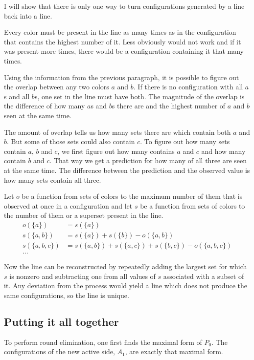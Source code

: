 \documentclass[english, 12pt, a4paper, sci, a-1b, online]{aaltothesis}
\begin{document}
I will show that there is only one way to turn configurations generated by a line back into a line.

Every color must be present in the line as many times as in the configuration that contains the highest number of it. Less obviously would not work and if it was present more times, there would be a configuration containing it that many times.

Using the information from the previous paragraph, it is possible to figure out the overlap between any two colors $a$ and $b$. If there is no configuration with all $a$s and all $b$s, one set in the line must have both. The magnitude of the overlap is the difference of how many $a$s and $b$s there are and the highest number of $a$ and $b$ seen at the same time.

The amount of overlap tells us how many sets there are which contain both $a$ and $b$. But some of those sets could also contain $c$. To figure out how many sets contain $a$, $b$ and $c$, we first figure out how many contains $a$ and $c$ and how many contain $b$ and $c$. That way we get a prediction for how many of all three are seen at the same time. The difference between the prediction and the observed value is how many sets contain all three.

Let $o$ be a function from sets of colors to the maximum number of them that is observed at once in a configuration and let $s$ be a function from sets of colors to the number of them or a superset present in the line.
\begin{align*}
  o(\{a\}) &= s(\{a\}) \\
  s(\{a, b\}) &= s(\{a\}) + s(\{b\}) - o(\{a, b\}) \\
  s(\{a, b, c\}) &= s(\{a, b\}) + s(\{a, c\}) + s(\{b, c\}) - o(\{a, b, c\}) \\
  ...
\end{align*}

Now the line can be reconstructed by repeatedly adding the largest set for which $s$ is nonzero and subtracting one from all values of $s$ associated with a subset of it. Any deviation from the process would yield a line which does not produce the same configurations, so the line is unique.

\subsection{Putting it all together}

To perform round elimination, one first finds the maximal form of $P_0$. The configurations of the new active side, $A_1$, are exactly that maximal form.
\end{document}
